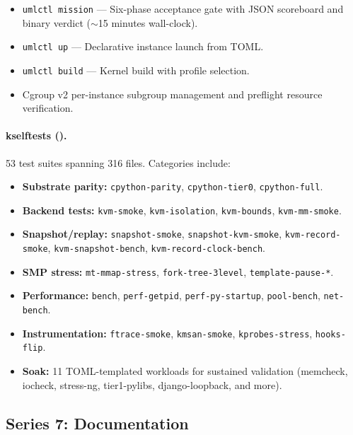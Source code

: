 \begin{itemize}[leftmargin=2em]
  \item \texttt{umlctl mission} --- Six-phase acceptance gate with
    JSON scoreboard and binary verdict ($\sim$15 minutes wall-clock).
  \item \texttt{umlctl up} --- Declarative instance launch from TOML.
  \item \texttt{umlctl build} --- Kernel build with profile selection.
  \item Cgroup v2 per-instance subgroup management and preflight
    resource verification.
\end{itemize}

\paragraph{kselftests ().}
53 test suites spanning 316 files.  Categories include:

\begin{itemize}[leftmargin=2em]
  \item \textbf{Substrate parity:} \texttt{cpython-parity},
    \texttt{cpython-tier0}, \texttt{cpython-full}.
  \item \textbf{Backend tests:} \texttt{kvm-smoke},
    \texttt{kvm-isolation}, \texttt{kvm-bounds}, \texttt{kvm-mm-smoke}.
  \item \textbf{Snapshot/replay:} \texttt{snapshot-smoke},
    \texttt{snapshot-kvm-smoke}, \texttt{kvm-record-smoke},
    \texttt{kvm-snapshot-bench}, \texttt{kvm-record-clock-bench}.
  \item \textbf{SMP stress:} \texttt{mt-mmap-stress},
    \texttt{fork-tree-3level}, \texttt{template-pause-*}.
  \item \textbf{Performance:} \texttt{bench}, \texttt{perf-getpid},
    \texttt{perf-py-startup}, \texttt{pool-bench}, \texttt{net-bench}.
  \item \textbf{Instrumentation:} \texttt{ftrace-smoke},
    \texttt{kmsan-smoke}, \texttt{kprobes-stress}, \texttt{hooks-flip}.
  \item \textbf{Soak:} 11 TOML-templated workloads for sustained
    validation (memcheck, iocheck, stress-ng, tier1-pylibs,
    django-loopback, and more).
\end{itemize}


\subsection{Series 7: Documentation}
\label{sec:v2-series7}


